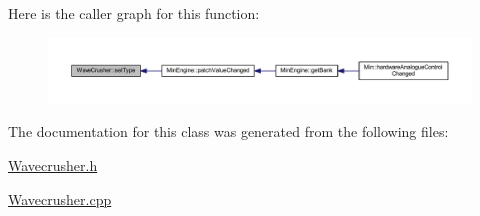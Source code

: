 Here is the caller graph for this function\+:
\nopagebreak
\begin{figure}[H]
\begin{center}
\leavevmode
\includegraphics[width=350pt]{class_wave_crusher_a61ba1c5b0cf0c3bd1f112de317f2deb3_icgraph}
\end{center}
\end{figure}


The documentation for this class was generated from the following files\+:\begin{DoxyCompactItemize}
\item 
\hyperlink{_wavecrusher_8h}{Wavecrusher.\+h}\item 
\hyperlink{_wavecrusher_8cpp}{Wavecrusher.\+cpp}\end{DoxyCompactItemize}
